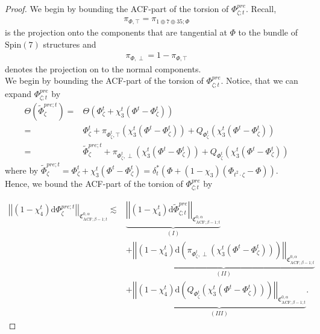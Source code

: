 \documentclass[psamsfonts]{amsart}
\theoremstyle{plain}
\theoremstyle{definition}{
\newtheorem{defi}{Definition}[section]
\newtheorem{ass}{Assumption}
\newtheorem*{nota}{Notation}}
\theoremstyle{remark}{
\newtheorem{rem}{Remark}
\newtheorem{ex}{Example}}
\theoremstyle{plain}{
\newtheorem{thm}{Theorem}[section]
\newtheorem{lem}{Lemma}[section]
\newtheorem{cor}{Corollary}[section]
\newtheorem{prop}{Proposition}[section]
\newtheorem{con}{Conjecture}[section]}
\newcommand{\m}[1]{{\mathrm{#1}}}
\begin{document}
\begin{proof}
We begin by bounding the ACF-part of the torsion of $\Phi^{pre}_{\zeta;t}$. Recall, 
\begin{align*}
    \pi_{\Phi,\top}=\pi_{1\oplus 7\oplus 35;\Phi}
\end{align*}
is the projection onto the components that are tangential at $\Phi$ to the bundle of $\m{Spin}(7)$ structures and 
\begin{align*}
    \pi_{\Phi,\perp}=1-\pi_{\Phi,\top}
\end{align*}
denotes the projection on to the normal components.\\

We begin by bounding the ACF-part of the torsion of $\Phi^{pre}_{\zeta;t}$. Notice, that we can expand $\Phi^{pre}_{\zeta;t}$ by
\begin{align*}
    \Theta(\widetilde{\Phi}^{pre;t}_{\zeta})=&\Theta(\Phi^t_{\zeta}+\chi^t_3(\Phi^t-\Phi^t_\zeta))\\
    =&\Phi^t_{\zeta}+\pi_{\Phi^t_\zeta,\top}\left(\chi^t_3(\Phi^t-\Phi^t_\zeta)\right)+Q_{\Phi^t_\zeta}\left(\chi^t_3(\Phi^t-\Phi^t_\zeta)\right)\\
    =&\widetilde{\Phi}^{pre;t}_{\zeta}+\pi_{\Phi^t_\zeta,\perp}\left(\chi^t_3(\Phi^t-\Phi^t_\zeta)\right)+Q_{\Phi^t_\zeta}\left(\chi^t_3(\Phi^t-\Phi^t_\zeta)\right)
\end{align*}
where by $\widetilde{\Phi}^{pre;t}_{\zeta}=\Phi^t_{\zeta}+\chi^t_3(\Phi^t-\Phi^t_\zeta)=\delta_t^*(\Phi+(1-\chi_3)(\Phi_{t^2\cdot\zeta}-\Phi))$.\\

Hence, we bound the ACF-part of the torsion of $\Phi^{pre}_{\zeta;t}$ by\\
\begin{minipage}{\linewidth}
\begin{align*}
    \left|\left|(1-\chi^t_4)\m{d}\Phi^{pre;t}_{\zeta}\right|\right|_{\mathfrak{C}^{0,\alpha}_{\m{ACF};\beta-1;t}}\lesssim &\underbrace{\left|\left|(1-\chi^t_4)\m{d}\widetilde{\Phi}^{pre}_{\zeta;t}\right|\right|_{\mathfrak{C}^{0,\alpha}_{\m{ACF};\beta-1;t}}}_{(I)}\\
    &+\underbrace{\left|\left|(1-\chi^t_4)\m{d}\left(\pi_{\Phi^t_\zeta,\perp}\left(\chi^t_3(\Phi^t-\Phi^t_\zeta)\right)\right)\right|\right|_{\mathfrak{C}^{0,\alpha}_{\m{ACF};\beta-1;t}}}_{(II)}\\
    &+\underbrace{\left|\left|(1-\chi^t_4)\m{d}\left(Q_{\Phi^t_\zeta}\left(\chi^t_3(\Phi^t-\Phi^t_\zeta)\right)\right)\right|\right|_{\mathfrak{C}^{0,\alpha}_{\m{ACF};\beta-1;t}}}_{(III)}.
\end{align*}
\end{minipage}


\end{proof}
\end{document}
